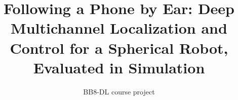 \documentclass[10pt,twocolumn]{article}
\title{Following a Phone by Ear: Deep Multichannel Localization and Control for a Spherical Robot, Evaluated in Simulation}
\author{BB8-DL course project}
\date{}
\begin{document}
\maketitle

\begin{abstract}

\end{abstract}





\end{document}
